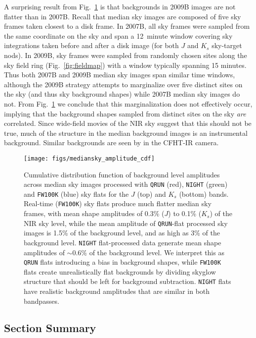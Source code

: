 \documentclass[iop,tighten]{emulateapj}
\newcommand{\Fig}[1]{Fig.~\ref{fig:#1}}  %
\begin{document}
A surprising result from \Fig{mediansky_amplitude} is that backgrounds in 2009B images are not flatter than in 2007B.
Recall that median sky images are composed of five sky frames taken closest to a disk frame.
In 2007B, all sky frames were sampled from the same coordinate on the sky and span a 12~minute window covering sky integrations taken before and after a disk image (for both $J$ and $K_s$ sky-target nods).
In 2009B, sky frames were sampled from randomly chosen sites along the sky field ring (\Fig{fieldmap}) with a window typically spanning 15 minutes.
Thus both 2007B and 2009B median sky images span similar time windows, although the 2009B strategy attempts to marginalize over five distinct sites  on the sky (and thus sky background shapes) while 2007B median sky images do not.
From \Fig{mediansky_amplitude} we conclude that this marginalization does not effectively occur, implying that the background shapes sampled from distinct sites on the sky \emph{are} correlated.
Since wide-field movies of the NIR sky \citep{Adams:1996} suggest that this should not be true, much of the structure in the median background images is an instrumental background.
Similar backgrounds are seen by \cite{Vaduvescu:2004} in the CFHT-IR camera.

\begin{figure}[t]
\centering
\texttt{[image: figs/mediansky\_amplitude\_cdf]}
\caption{Cumulative distribution function of background level amplitudes across median sky images processed with \texttt{QRUN} (red), \texttt{NIGHT} (green) and \texttt{FW100K} (blue) sky flats for the $J$ (top) and $K_s$ (bottom) bands. Real-time (\texttt{FW100K}) sky flats produce much flatter median sky frames, with mean shape amplitudes of 0.3\% ($J$) to 0.1\% ($K_s$) of the NIR sky level, while the mean amplitude of \texttt{QRUN}-flat processed sky images is 1.5\% of the background level, and as high as 3\% of the background level. \texttt{NIGHT} flat-processed data generate mean shape amplitudes of $\sim 0.6\%$ of the background level.
We interpret this as \texttt{QRUN} flats introducing a bias in background shapes, while \texttt{FW100K} flats create unrealistically flat backgrounds by dividing skyglow structure that should be left for background subtraction.
\texttt{NIGHT} flats have realistic background amplitudes that are similar in both bandpasses.
}
\label{fig:mediansky_amplitude}
\end{figure}


\subsection{Section Summary}
\label{sec:shapeconclusions}
\end{document}

